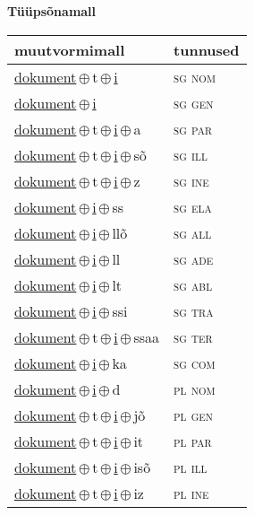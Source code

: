 

\vspace{3.5em}
\noindent \begin{minipage}{\textwidth}
\noindent \textbf{Tüüpsõnamall \,}\\

\begin{sideways}
\begin{tabular}{l l}
muutvormimall & tunnused \\
\hline
\underline{dokument}\,$\oplus$\,t\,$\oplus$\,\underline{i} & \textsc{ sg nom } \\
\underline{dokument}\,$\oplus$\,\underline{i} & \textsc{ sg gen } \\
\underline{dokument}\,$\oplus$\,t\,$\oplus$\,\underline{i}\,$\oplus$\,a & \textsc{ sg par } \\
\underline{dokument}\,$\oplus$\,t\,$\oplus$\,\underline{i}\,$\oplus$\,sõ & \textsc{ sg ill } \\
\underline{dokument}\,$\oplus$\,t\,$\oplus$\,\underline{i}\,$\oplus$\,z & \textsc{ sg ine } \\
\underline{dokument}\,$\oplus$\,\underline{i}\,$\oplus$\,ss & \textsc{ sg ela } \\
\underline{dokument}\,$\oplus$\,\underline{i}\,$\oplus$\,llõ & \textsc{ sg all } \\
\underline{dokument}\,$\oplus$\,\underline{i}\,$\oplus$\,ll & \textsc{ sg ade } \\
\underline{dokument}\,$\oplus$\,\underline{i}\,$\oplus$\,lt & \textsc{ sg abl } \\
\underline{dokument}\,$\oplus$\,\underline{i}\,$\oplus$\,ssi & \textsc{ sg tra } \\
\underline{dokument}\,$\oplus$\,t\,$\oplus$\,\underline{i}\,$\oplus$\,ssaa & \textsc{ sg ter } \\
\underline{dokument}\,$\oplus$\,\underline{i}\,$\oplus$\,ka & \textsc{ sg com } \\
\underline{dokument}\,$\oplus$\,\underline{i}\,$\oplus$\,d & \textsc{ pl nom } \\
\underline{dokument}\,$\oplus$\,t\,$\oplus$\,\underline{i}\,$\oplus$\,jõ & \textsc{ pl gen } \\
\underline{dokument}\,$\oplus$\,t\,$\oplus$\,\underline{i}\,$\oplus$\,it & \textsc{ pl par } \\
\underline{dokument}\,$\oplus$\,t\,$\oplus$\,\underline{i}\,$\oplus$\,isõ & \textsc{ pl ill } \\
\underline{dokument}\,$\oplus$\,t\,$\oplus$\,\underline{i}\,$\oplus$\,iz & \textsc{ pl ine } \\

\end{tabular}
\end{sideways}
\end{minipage}
